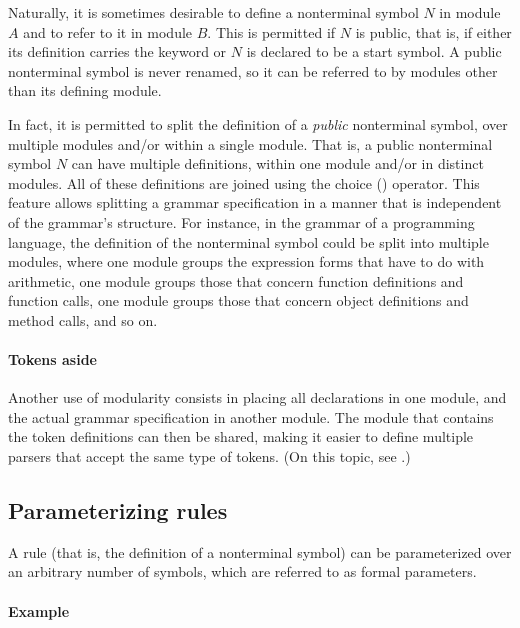 \documentclass[onecolumn,11pt,nocopyrightspace,preprint]{sigplanconf}
\begin{document}
Naturally, it is sometimes desirable to define a nonterminal symbol $N$ in
module $A$ and to refer to it in module $B$. This is permitted if $N$ is
public, that is, if either its definition carries the keyword \dpublic or
$N$ is declared to be a start symbol. A public nonterminal symbol is never
renamed, so it can be referred to by modules other than its defining module.

In fact, it is permitted to split the definition of a \emph{public} nonterminal
symbol, over multiple modules and/or within a single module.
That is, a public nonterminal symbol $N$ can
have multiple definitions, within one module and/or in distinct modules.
All of these definitions are joined using the choice (\barre) operator. This
feature allows splitting a grammar specification in a manner that is
independent of the grammar's structure. For instance, in the grammar of a
programming language, the definition of the nonterminal symbol 
could be split into multiple modules, where one module groups the expression
forms that have to do with arithmetic, one module groups those that concern
function definitions and function calls, one module groups those that concern
object definitions and method calls, and so on.

\paragraph{Tokens aside}

Another use of modularity consists in placing all \dtoken declarations in one
module, and the actual grammar specification in another module. The module
that contains the token definitions can then be shared, making it easier to
define multiple parsers that accept the same type of tokens. (On this topic,
see .)

\subsection{Parameterizing rules}
\label{sec:templates}

A rule (that is, the definition of a nonterminal symbol) can be parameterized
over an arbitrary number of symbols, which are referred to as formal
parameters.

\paragraph{Example}
\end{document}
